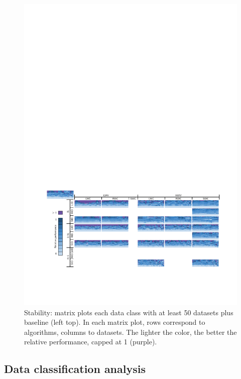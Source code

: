 \begin{figure}
    \centering
    \includegraphics{figures/treemap-evaluation/baseCTDRug}
    \caption{Stability: matrix plots each data class with at least 50 datasets plus baseline (left top). In each matrix plot, rows correspond to algorithms, columns to datasets. 
    The lighter the color, the better the relative performance, capped at 1 (purple).}
    \label{fig:ctdrug}
\end{figure}


\subsection{Data classification analysis}\label{sec:validity}


